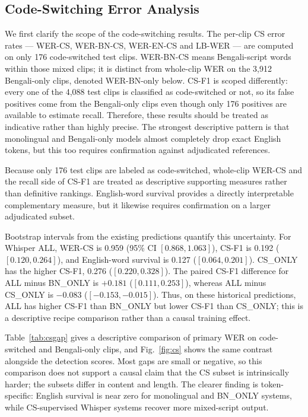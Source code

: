 \documentclass[journal]{IEEEtran}
\begin{document}
\subsection{Code-Switching Error Analysis}

We first clarify the scope of the code-switching results. The per-clip CS error rates --- WER-CS, WER-BN-CS, WER-EN-CS and LB-WER --- are computed on only 176 code-switched test clips. WER-BN-CS means Bengali-script words within those mixed clips; it is distinct from whole-clip WER on the 3{,}912 Bengali-only clips, denoted WER-BN-only below. CS-F1 is scoped differently: every one of the 4{,}088 test clips is classified as code-switched or not, so its false positives come from the Bengali-only clips even though only 176 positives are available to estimate recall. Therefore, these results should be treated as indicative rather than highly precise. The strongest descriptive pattern is that monolingual and Bengali-only models almost completely drop exact English tokens, but this too requires confirmation against adjudicated references.

Because only 176 test clips are labeled as code-switched, whole-clip WER-CS and
the recall side of CS-F1 are treated as descriptive supporting measures rather
than definitive rankings. English-word survival provides a directly interpretable complementary
measure, but it likewise requires confirmation on a larger adjudicated subset.

Bootstrap intervals from the existing predictions quantify this uncertainty.
For Whisper ALL, WER-CS is 0.959 (95\% CI $[0.868,1.063]$), CS-F1 is 0.192
($[0.120,0.264]$), and English-word survival is 0.127
($[0.064,0.201]$). CS\_ONLY has the higher CS-F1, 0.276
($[0.220,0.328]$). The paired CS-F1 difference for ALL minus BN\_ONLY is
$+0.181$ ($[0.111,0.253]$), whereas ALL minus CS\_ONLY is $-0.083$
($[-0.153,-0.015]$). Thus, on these historical predictions, ALL has higher
CS-F1 than BN\_ONLY but lower CS-F1 than CS\_ONLY; this is a descriptive recipe
comparison rather than a causal training effect.

Table~\ref{tab:csgap} gives a descriptive comparison of primary WER on
code-switched and Bengali-only clips, and Fig.~\ref{fig:cs} shows the same
contrast alongside the detection scores. Most gaps are small or negative, so this
comparison does not support a causal claim that the CS subset is intrinsically
harder; the subsets differ in content and length. The clearer finding is
token-specific: English survival is near zero for monolingual and BN\_ONLY
systems, while CS-supervised Whisper systems recover more mixed-script output.
\end{document}
